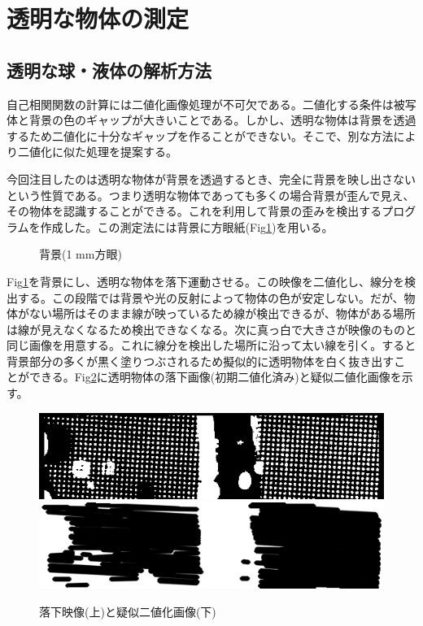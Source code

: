 \documentclass[a4j,12pt,dvipdfmx]{jsarticle}
\begin{document}
\section{透明な物体の測定}
\subsection{透明な球・液体の解析方法}
自己相関関数の計算には二値化画像処理が不可欠である。二値化する条件は被写体と背景の色のギャップが大きいことである。しかし、透明な物体は背景を透過するため二値化に十分なギャップを作ることができない。そこで、別な方法により二値化に似た処理を提案する。 \par
今回注目したのは透明な物体が背景を透過するとき、完全に背景を映し出さないという性質である。つまり透明な物体であっても多くの場合背景が歪んで見え、その物体を認識することができる。これを利用して背景の歪みを検出するプログラムを作成した。この測定法には背景に方眼紙(Fig\ref{fig:block})を用いる。
\begin{figure}[H]
	\centering
	\caption{背景(1 mm方眼)}
	\label{fig:block}
\end{figure}
Fig\ref{fig:block}を背景にし、透明な物体を落下運動させる。この映像を二値化し、線分を検出する。この段階では背景や光の反射によって物体の色が安定しない。だが、物体がない場所はそのまま線が映っているため線が検出できるが、物体がある場所は線が見えなくなるため検出できなくなる。次に真っ白で大きさが映像のものと同じ画像を用意する。これに線分を検出した場所に沿って太い線を引く。すると背景部分の多くが黒く塗りつぶされるため擬似的に透明物体を白く抜き出すことができる。Fig\ref{fig:line}に透明物体の落下画像(初期二値化済み)と疑似二値化画像を示す。
\begin{figure}[H]
	\includegraphics[scale=0.4]{water_two.png}
	\includegraphics[scale=0.4]{water_line.png}
	\caption{落下映像(上)と疑似二値化画像(下)}
	\label{fig:line}
\end{figure}
\end{document}
